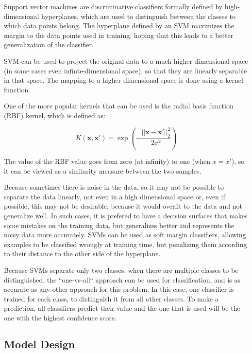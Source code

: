 Support vector machines\cite{Cortes_1995} are discriminative classifiers formally defined by high-dimensional hyperplanes, which are used to distinguish between the classes to which data points belong. The hyperplane defined by an SVM maximizes the margin to the data points used in training, hoping that this leads to a better generalization of the classifier. 

SVM can be used to project the original data to a much higher dimensional space (in some cases even infinte-dimensional space), so that they are linearly separable in that space. The mapping to a higher dimensional space is done using a kernel function. 

One of the more popular kernels\cite{Chang:2010:TTL:1756006.1859899} that can be used is the radial basis function (RBF) kernel, which is defined as:

\[
    K(\mathbf{x}, \mathbf{x'}) = \exp\left(-\frac{||\mathbf{x} - \mathbf{x'}||_2^2}{2\sigma^2}\right) 
\]

The value of the RBF value goes from zero (at infinity) to one (when $ x = x'$), so it can be viewed as a similarity measure between the two samples. \cite{Vert}

Because sometimes there is noise in the data, so it may not be possible to separate the data linearly, not even in a high dimensional space or, even if possible, this may not be desirable, because it would overfit to the data and not generalize well. In such cases, it is prefered to have a decision surfaces that makes some mistakes on the training data, but generalizes better and represents the noisy data more accurately. SVMs can be used as soft margin classifiers, allowing examples to be classified wrongly at training time, but penalizing them according to their distance to the other side of the hyperplane. \cite{russell1995artificial}

Because SVMs separate only two classes, when there are multiple classes to be distinguished, the ``one-vs-all`` approach can be used for classification, and is as accurate as any other approach for this problem\cite{rifkin2004defense}. In this case, one classifier is trained for each class, to distinguish it from all other classes. To make a prediction, all classifiers predict their value and the one that is used will be the one with the highest confidence score.

\subsection{Model Design}

